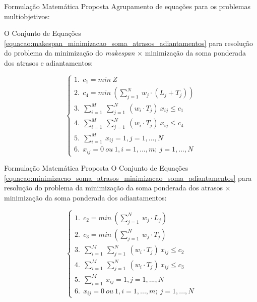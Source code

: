 \documentclass[]{beamer}
\begin{document}
	\begin{frame}{Formulação Matemática Proposta}	
		Agrupamento de equações para os problemas multiobjetivos:

		O Conjunto de Equações \ref{equacao:makespan_minimizacao_soma_atrasos_adiantamentos} para
		resolução do problema da minimização do \textit{makespan} $\times$ minimização da soma
		ponderada dos atrasos e adiantamentos: 


		\begin{equation}\label{equacao:makespan_minimizacao_soma_atrasos_adiantamentos}
			\begin{cases}
			1.\ \  c_{1} = min \ Z \\
			2.\ \  c_{4} = min  \ \left (  \sum_{j=1}^N  \ w_{j} \cdot (L_{j} + T_{j})\right ) \\
			3.\ \  \sum_{i=1}^M  \  \sum_{j=1}^N  \ (w_{i} \cdot T_{j} )\ x_{ij} \leq c_{1} \\
			4.\ \  \sum_{i=1}^M  \  \sum_{j=1}^N  \ (w_{i} \cdot T_{j} )\ x_{ij} \leq c_{4} \\
			5.\ \  \sum_{i=1}^M  \ x_{ij} = 1,j = 1, ...,N \\
			6.\ \  x_{ij} = 0 \ ou \ 1,i = 1, ...,m;\ j = 1, ...,N
			\end{cases}
		\end{equation}

	\end{frame}

	\begin{frame}{Formulação Matemática Proposta}	
			O Conjunto de Equações \ref{equacao:minimizacao_soma_atrasos_minimizacao_soma_adiantamentos} para
		resolução do problema da minimização da soma ponderada dos atrasos $\times$
		minimização da soma ponderada dos adiantamentos: 

		\begin{equation}\label{equacao:minimizacao_soma_atrasos_minimizacao_soma_adiantamentos}
			\begin{cases}
			1. \ \    c_{2} = min  \ \left (  \sum_{j=1}^N  \ w_{j} \cdot L_{j}\right ) \\
			2. \ \    c_{3} = min  \ \left (  \sum_{j=1}^N  \ w_{j} \cdot T_{j}\right ) \\
			3. \ \     \sum_{i=1}^M  \  \sum_{j=1}^N  \ (w_{i} \cdot T_{j} )\ x_{ij} \leq c_{2} \\
			4. \ \     \sum_{i=1}^M  \  \sum_{j=1}^N  \ (w_{i} \cdot T_{j} )\ x_{ij} \leq c_{3} \\
			5. \ \     \sum_{i=1}^M  \ x_{ij} = 1,j = 1, ...,N \\
			6. \ \     x_{ij} = 0 \ ou \ 1,i = 1, ...,m;\ j = 1, ...,N
			\end{cases}
		\end{equation}

	\end{frame}
\end{document}
